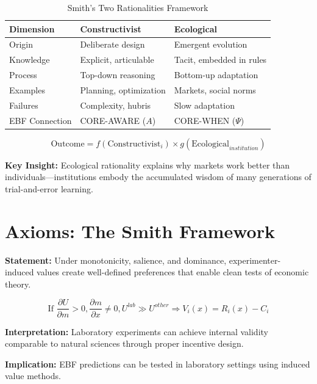 \begin{table}[htbp]
\centering
\caption{Smith's Two Rationalities Framework}
\label{tab:vs-rationalities}
\renewcommand{\arraystretch}{1.4}
\begin{tabular}{@{}lll@{}}
\toprule
\textbf{Dimension} & \textbf{Constructivist} & \textbf{Ecological} \\
\midrule
Origin & Deliberate design & Emergent evolution \\
Knowledge & Explicit, articulable & Tacit, embedded in rules \\
Process & Top-down reasoning & Bottom-up adaptation \\
Examples & Planning, optimization & Markets, social norms \\
Failures & Complexity, hubris & Slow adaptation \\
EBF Connection & CORE-AWARE ($A$) & CORE-WHEN ($\Psi$) \\
\bottomrule
\end{tabular}
\end{table}

\begin{equation}
\text{Outcome} = f(\text{Constructivist}_i) \times g(\text{Ecological}_{institution})
\label{eq:vs-two-rationalities}
\end{equation}

\textbf{Key Insight:} Ecological rationality explains why markets work better
than individuals---institutions embody the accumulated wisdom of many
generations of trial-and-error learning.


\section{Axioms: The Smith Framework}
\label{sec:vs-axioms}

\begin{tcolorbox}[colback=gray!5!white, colframe=gray!75!black,
    title=Axiom VS-1: Induced Value Sufficiency]
\textbf{Statement:} Under monotonicity, salience, and dominance, experimenter-
induced values create well-defined preferences that enable clean tests of
economic theory.

\begin{equation}
\text{If } \frac{\partial U}{\partial m} > 0, \frac{\partial m}{\partial x} \neq 0, U^{lab} \gg U^{other} \Rightarrow V_i(x) = R_i(x) - C_i
\end{equation}

\textbf{Interpretation:} Laboratory experiments can achieve internal validity
comparable to natural sciences through proper incentive design.

\textbf{Implication:} EBF predictions can be tested in laboratory settings
using induced value methods.
\end{tcolorbox}

